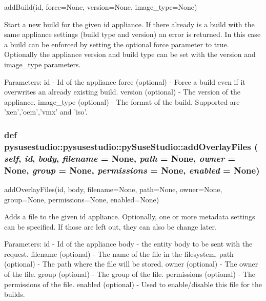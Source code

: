 \begin{DoxyVerb}addBuild(id, force=None, version=None, image_type=None)

            Start a new build for the given id appliance. 
            If there already is a build with the same appliance settings (build type and version) 
            an error is returned. In this case a build can be enforced by setting the optional 
            force parameter to true.
            Optionally the appliance version and build type can be set with the version and image_type parameters. 
            
            Parameters:
id - Id of the appliance
force (optional) - Force a build even if it overwrites an already existing build. 
version (optional) - The version of the appliance. 
image_type (optional) -  The format of the build. Supported are 'xen','oem','vmx' and 'iso'. 

\end{DoxyVerb}
 \hypertarget{classpysusestudio_1_1pysusestudio_1_1py_suse_studio_ab533bbed05c11f32c75bd0bcf92467bc}{
\subsubsection[{addOverlayFiles}]{\setlength{\rightskip}{0pt plus 5cm}def pysusestudio::pysusestudio::pySuseStudio::addOverlayFiles ( {\em self}, \/   {\em id}, \/   {\em body}, \/   {\em filename} = {\ttfamily None}, \/   {\em path} = {\ttfamily None}, \/   {\em owner} = {\ttfamily None}, \/   {\em group} = {\ttfamily None}, \/   {\em permissions} = {\ttfamily None}, \/   {\em enabled} = {\ttfamily None})}}
\label{classpysusestudio_1_1pysusestudio_1_1py_suse_studio_ab533bbed05c11f32c75bd0bcf92467bc}
\begin{DoxyVerb}addOverlayFiles(id, body, filename=None, path=None, owner=None, group=None, permissions=None, enabled=None)

            Adds a file to the given id appliance. 
            Optionally, one or more metadata settings can be specified. If those are left out, they 
            can also be change later. 
            
            Parameters:
id - Id of the appliance
body - the entity body to be sent with the request.
filename (optional) - The name of the file in the filesystem. 
path (optional) - The path where the file will be stored. 
owner (optional) - The owner of the file. 
group (optional) - The group of the file. 
permissions (optional) - The permissions of the file. 
enabled (optional) - Used to enable/disable this file for the builds. 

\end{DoxyVerb}
